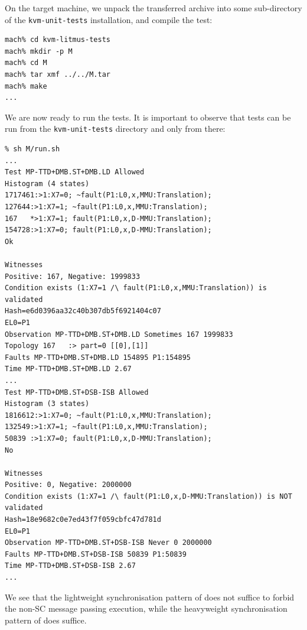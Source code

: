 On the target machine, we unpack the transferred archive into some
sub-directory of the \texttt{kvm-unit-tests} installation, and compile
the test:
\begin{verbatim}
mach% cd kvm-litmus-tests
mach% mkdir -p M
mach% cd M
mach% tar xmf ../../M.tar
mach% make
...
\end{verbatim}
We are now ready to run the tests. It is important to observe that
tests can be run from the \texttt{kvm-unit-tests} directory and only from
there:
\begin{verbatim}
% sh M/run.sh
...
Test MP-TTD+DMB.ST+DMB.LD Allowed
Histogram (4 states)
1717461:>1:X7=0; ~fault(P1:L0,x,MMU:Translation);
127644:>1:X7=1; ~fault(P1:L0,x,MMU:Translation);
167   *>1:X7=1; fault(P1:L0,x,D-MMU:Translation);
154728:>1:X7=0; fault(P1:L0,x,D-MMU:Translation);
Ok

Witnesses
Positive: 167, Negative: 1999833
Condition exists (1:X7=1 /\ fault(P1:L0,x,MMU:Translation)) is validated
Hash=e6d0396aa32c40b307db5f6921404c07
EL0=P1
Observation MP-TTD+DMB.ST+DMB.LD Sometimes 167 1999833
Topology 167   :> part=0 [[0],[1]]
Faults MP-TTD+DMB.ST+DMB.LD 154895 P1:154895
Time MP-TTD+DMB.ST+DMB.LD 2.67
...
Test MP-TTD+DMB.ST+DSB-ISB Allowed
Histogram (3 states)
1816612:>1:X7=0; ~fault(P1:L0,x,MMU:Translation);
132549:>1:X7=1; ~fault(P1:L0,x,MMU:Translation);
50839 :>1:X7=0; fault(P1:L0,x,D-MMU:Translation);
No

Witnesses
Positive: 0, Negative: 2000000
Condition exists (1:X7=1 /\ fault(P1:L0,x,D-MMU:Translation)) is NOT validated
Hash=18e9682c0e7ed43f7f059cbfc47d781d
EL0=P1
Observation MP-TTD+DMB.ST+DSB-ISB Never 0 2000000
Faults MP-TTD+DMB.ST+DSB-ISB 50839 P1:50839
Time MP-TTD+DMB.ST+DSB-ISB 2.67
...
\end{verbatim}
We see that the lightweight synchronisation pattern
of  does not suffice to forbid the non-SC
message passing execution, while the heavyweight  synchronisation
pattern of  does suffice.

